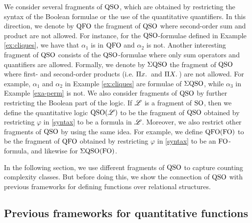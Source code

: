We consider several fragments of ${\rm QSO}$, which are obtained by restricting the syntax of the Boolean formulae or the use of the quantitative quantifiers.
In this direction, we denote by ${\rm QFO}$ the fragment of ${\rm QSO}$ where second-order sum and product are not allowed. 
For instance, for the ${\rm QSO}$-formulae defined in Example \ref{ex:cliques}, we have that $\alpha_1$ is in ${\rm QFO}$ and $\alpha_2$ is not.
Another interesting fragment of ${\rm QSO}$ consists of the ${\rm QSO}$-formulae where only sum operators and quantifiers are allowed. 
Formally, we denote by $\Sigma{\rm QSO}$ the fragment of ${\rm QSO}$ where first- and second-order products (i.e. $\Pi{x}.\,$ and $\Pi{X}.\,$) are not allowed.
For example, $\alpha_1$ and $\alpha_2$ in Example \ref{ex:cliques} are formulae of $\Sigma{\rm QSO}$, while $\alpha_3$ in Example \ref{exa-perm} is not. 
We also consider fragments of ${\rm QSO}$ by further restricting the Boolean part of the logic.
If $\mathscr{L}$ is a fragment of ${\rm SO}$, then we define the quantitative logic ${\rm QSO}(\mathscr{L})$ to be the fragment of ${\rm QSO}$ obtained by restricting $\varphi$ in \eqref{syntax} to be a formula in $\mathscr{L}$. Moreover, we also restrict other fragments of ${\rm QSO}$ by using the same idea. 
For example, we define ${\rm QFO}({\rm FO})$ to be the fragment of ${\rm QFO}$ obtained by restricting $\varphi$ in \eqref{syntax} to be an ${\rm FO}$-formula, and likewise for $\Sigma{\rm QSO}({\rm FO})$.


In the following section, we use different fragments of ${\rm QSO}$ to capture counting complexity classes. 
But before doing this, we 
show the connection of ${\rm QSO}$ with previous frameworks for defining functions over relational structures.

\subsection{Previous frameworks for quantitative functions} \label{sec:previous}

